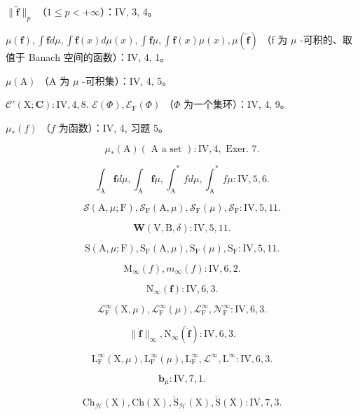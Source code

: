 \(\| \widetilde{\mathbf{f}} \| _p\) （\(1\leqslant p < + \infty\)）：IV, 3, 4。

\(\mu (\mathbf{f}),\int \mathbf{f}d\mu ,\int \mathbf{f}(x)d\mu (x),\int \mathbf{f}\mu ,\int \mathbf{f}(x)\mu (x),\mu (\widetilde{\mathbf{f}})\) （f 为 \(\mu\) -可积的、取值于 Banach 空间的函数）：IV, 4, 1。

\(\mu (\mathrm{A})\) （A 为 \(\mu\) -可积集）：IV, 4, 5。

\(\mathcal{C}'(\mathrm{X};\mathbf{C}):\mathrm{IV},4,8.\) \(\mathcal{E}(\Phi),\mathcal{E}_{\mathrm{F}}(\Phi)\) （\(\Phi\) 为一个集环）：IV, 4, 9。

\(\mu_{*}(f)\) （\(f\) 为函数）：IV, 4, 习题 5。

\[
\mu_ {*} (\mathrm{A}) (\text { A a set }): \mathrm{IV}, 4, \text { Exer. } 7.
\]

\[
\int_ {\mathrm{A}} \textbf {f} d \mu , \int_ {\mathrm{A}} \textbf {f} \mu , \int_ {\mathrm{A}} ^ {*} f d \mu , \int_ {\mathrm{A}} ^ {*} f \mu : \mathrm{IV}, 5, 6.
\]

\[
\mathcal {S} (\mathrm{A}, \mu ; \mathrm{F}), \mathcal {S} _ {\mathrm{F}} (\mathrm{A}, \mu), \mathcal {S} _ {\mathrm{F}} (\mu), \mathcal {S} _ {\mathrm{F}}: \mathrm{IV}, 5, 11.
\]

\[
\boldsymbol {W} (\mathrm{V}, \mathrm{B}, \delta): \mathrm{IV}, 5, 11.
\]

\[
\mathrm{S} (\mathrm{A}, \mu ; \mathrm{F}), \mathrm{S} _ {\mathrm{F}} (\mathrm{A}, \mu), \mathrm{S} _ {\mathrm{F}} (\mu), \mathrm{S} _ {\mathrm{F}}: \mathrm{IV}, 5, 11.
\]

\[
\mathrm{M} _ {\infty} (f), m _ {\infty} (f): \mathrm{IV}, 6, 2.
\]

\[
\mathrm{N} _ {\infty} (\mathbf {f}): \mathrm{IV}, 6, 3.
\]

\[
\mathcal {L} _ {\mathrm{F}} ^ {\infty} (\mathrm{X}, \mu), \mathcal {L} _ {\mathrm{F}} ^ {\infty} (\mu), \mathcal {L} _ {\mathrm{F}} ^ {\infty}, \mathcal {N} _ {\mathrm{F}} ^ {\infty}: \mathrm{IV}, 6, 3.
\]

\[
\| \dot {\mathbf {f}} \| _ {\infty}, \mathrm{N} _ {\infty} (\dot {\mathbf {f}}): \mathrm{IV}, 6, 3.
\]

\[
\mathrm{L} _ {\mathrm{F}} ^ {\infty} (\mathrm{X}, \mu), \mathrm{L} _ {\mathrm{F}} ^ {\infty} (\mu), \mathrm{L} _ {\mathrm{F}} ^ {\infty}, \mathcal {L} ^ {\infty}, \mathrm{L} ^ {\infty}: \mathrm{IV}, 6, 3.
\]

\[
\mathbf {b} _ {\mu}: \mathrm{IV}, 7, 1.
\]

\[
\mathrm{Ch} _ {\mathcal {H}} (\mathrm{X}), \mathrm{Ch} (\mathrm{X}), \check {\mathrm{S}} _ {\mathcal {H}} (\mathrm{X}), \check {\mathrm{S}} (\mathrm{X}): \mathrm{IV}, 7, 3.
\]

